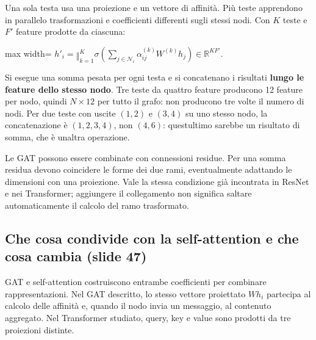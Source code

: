 \documentclass[11pt,a4paper,oneside,openany]{book}
\begin{document}
Una sola testa usa una proiezione e un vettore di affinità. Più teste apprendono in parallelo trasformazioni e coefficienti differenti sugli stessi nodi. Con \(K\) teste e \(F'\) feature prodotte da ciascuna:

\begin{center}
\begin{adjustbox}{max width=\linewidth}
$\displaystyle \boxed{h'_i=\mathop{\Vert}_{k=1}^K
\sigma\left(\sum_{j\in\mathcal N_i}\alpha_{ij}^{(k)}W^{(k)}h_j\right)
\in\mathbb R^{KF'}.}$
\end{adjustbox}
\end{center}

Si esegue una somma pesata per ogni testa e si concatenano i risultati \textbf{lungo le feature dello stesso nodo}. Tre teste da quattro feature producono 12 feature per nodo, quindi \(N\times12\) per tutto il grafo: non producono tre volte il numero di nodi. Per due teste con uscite \((1,2)\) e \((3,4)\) su uno stesso nodo, la concatenazione è \((1,2,3,4)\), non \((4,6)\): quest\textquotesingle ultimo sarebbe un risultato di somma, che è un\textquotesingle altra operazione.

Le GAT possono essere combinate con connessioni residue. Per una somma residua devono coincidere le forme dei due rami, eventualmente adattando le dimensioni con una proiezione. Vale la stessa condizione già incontrata in ResNet e nei Transformer; aggiungere il collegamento non significa saltare automaticamente il calcolo del ramo trasformato.

\subsection{Che cosa condivide con la self-attention e che cosa cambia (slide 47)}\label{f05-n30-r962}

GAT e self-attention costruiscono entrambe coefficienti per combinare rappresentazioni. Nel GAT descritto, lo stesso vettore proiettato \(Wh_i\) partecipa al calcolo delle affinità e, quando il nodo invia un messaggio, al contenuto aggregato. Nel Transformer studiato, query, key e value sono prodotti da tre proiezioni distinte.
\end{document}
